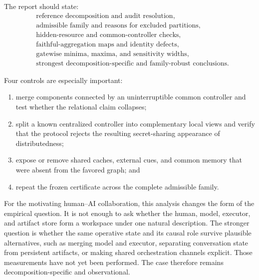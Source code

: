 The report should state:
\[
\begin{aligned}
&\text{reference decomposition and audit resolution},\\
&\text{admissible family and reasons for excluded partitions},\\
&\text{hidden-resource and common-controller checks},\\
&\text{faithful-aggregation maps and identity defects},\\
&\text{gatewise minima, maxima, and sensitivity widths},\\
&\text{strongest decomposition-specific and family-robust conclusions}.
\end{aligned}
\]

Four controls are especially important:
\begin{enumerate}
\item merge components connected by an uninterruptible common controller and
 test whether the relational claim collapses;
\item split a known centralized controller into complementary local views and
 verify that the protocol rejects the resulting secret-sharing appearance of
 distributedness;
\item expose or remove shared caches, external cues, and common memory that
 were absent from the favored graph; and
\item repeat the frozen certificate across the complete admissible family.
\end{enumerate}

For the motivating human--AI collaboration, this analysis changes the form of
the empirical question. It is not enough to ask whether the human, model,
executor, and artifact store form a workspace under one natural description.
The stronger question is whether the same operative state and its causal role
survive plausible alternatives, such as merging model and executor, separating
conversation state from persistent artifacts, or making shared orchestration
channels explicit. Those measurements have not yet been performed. The case
therefore remains decomposition-specific and observational.
